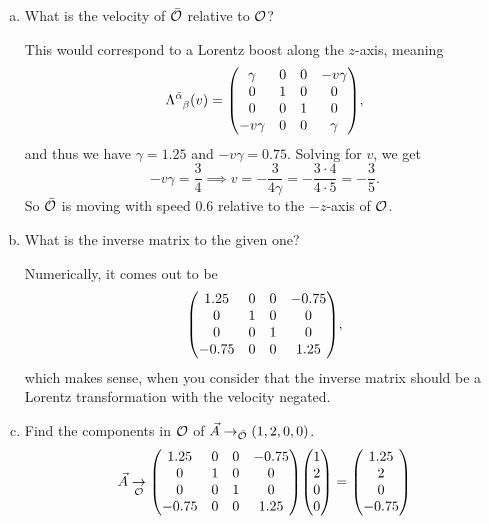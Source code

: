 \documentclass[gr-notes.tex]{subfiles}
\begin{document}
\begin{enumerate}[(a)]

\item What is the velocity of $\bar{\mathcal{O}}$ relative to $\mathcal{O}$?

This would correspond to a Lorentz boost along the $z$-axis, meaning
%
\begin{displaymath}
  \tensor{\Lambda}{^{\bar\alpha}_\beta}(v) =
  \mqty(
    \gamma & 0 & 0 & -v\gamma
    \\
    0 & 1 & 0 & 0
    \\
    0 & 0 & 1 & 0
    \\
    -v\gamma & 0 & 0 & \gamma
  ),
\end{displaymath}
%
and thus we have $\gamma = 1.25$ and $-v\gamma = 0.75$. Solving for $v$, we get
%
\begin{displaymath}
  -v \gamma =
  \frac{3}{4} \implies
  v =
  -\frac{3}{4 \gamma} =
  -\frac{3 \cdot 4}{4 \cdot 5} =
  -\frac{3}{5}.
\end{displaymath}
%
So $\bar{\mathcal{O}}$ is moving with speed $0.6$ relative to the $-z$-axis of $\mathcal{O}$.

\item What is the inverse matrix to the given one?

Numerically, it comes out to be
\begin{displaymath}
  \mqty(
    1.25 & 0 & 0 & -0.75
    \\
    0 & 1 & 0 & 0
    \\
    0 & 0 & 1 & 0
    \\
    -0.75 & 0 & 0 & 1.25
  ),
\end{displaymath}
which makes sense, when you consider that the inverse matrix should be a Lorentz transformation with the velocity negated.

\item Find the components in $\mathcal{O}$ of $\vec{A} \to_{\bar{\mathcal{O}}} (1, 2, 0, 0)$.
%
\begin{displaymath}
  \vec{A} \underset{\obs}{\to}
  \mqty(
    1.25 & 0 & 0 & -0.75
    \\
    0 & 1 & 0 & 0
    \\
    0 & 0 & 1 & 0
    \\
    -0.75 & 0 & 0 & 1.25
  )
  \mqty( 1 \\ 2 \\ 0 \\ 0 ) =
  \mqty( 1.25 \\ 2 \\ 0 \\ -0.75 )
\end{displaymath}

\end{enumerate}
\end{document}
